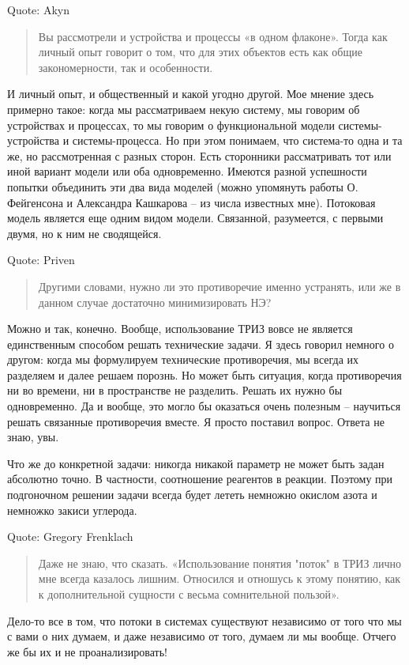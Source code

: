 \documentclass[a4paper,11pt]{article}
\begin{document}
Quote: Akyn
\begin{quote}
  Вы рассмотрели и устройства и процессы «в одном флаконе». Тогда как личный
  опыт говорит о том, что для этих объектов есть как общие закономерности, так
  и особенности.
\end{quote}
И личный опыт, и общественный и какой угодно другой. Мое мнение здесь примерно
такое: когда мы рассматриваем некую систему, мы говорим об устройствах и
процессах, то мы говорим о функциональной модели системы-устройства и
системы-процесса. Но при этом понимаем, что система-то одна и та же, но
рассмотренная с разных сторон. Есть сторонники рассматривать тот или иной
вариант модели или оба одновременно. Имеются разной успешности попытки
объединить эти два вида моделей (можно упомянуть работы О. Фейгенсона и
Александра Кашкарова – из числа известных мне). Потоковая модель является еще
одним видом модели. Связанной, разумеется, с первыми двумя, но к ним не
сводящейся.

Quote: Priven
\begin{quote}      
  Другими словами, нужно ли это противоречие именно устранять, или же в данном
  случае достаточно минимизировать НЭ?
\end{quote}
Можно и так, конечно. Вообще, использование ТРИЗ вовсе не является
единственным способом решать технические задачи. Я здесь говорил немного о
другом: когда мы формулируем технические противоречия, мы всегда их разделяем
и далее решаем порознь. Но может быть ситуация, когда противоречия ни во
времени, ни в пространстве не разделить. Решать их нужно бы одновременно. Да и
вообще, это могло бы оказаться очень полезным – научиться решать связанные
противоречия вместе. Я просто поставил вопрос. Ответа не знаю, увы.

Что же до конкретной задачи: никогда никакой параметр не может быть задан
абсолютно точно. В частности, соотношение реагентов в реакции. Поэтому при
подгоночном решении задачи всегда будет лететь немножно окислом азота и
немножко закиси углерода.

Quote: Gregory Frenklach
\begin{quote}
  Даже не знаю, что сказать.  «Использование понятия "поток" в ТРИЗ лично мне
  всегда казалось лишним.  Относился и отношусь к этому понятию, как к
  дополнительной сущности с весьма сомнительной пользой».
\end{quote}
Дело-то все в том, что потоки в системах существуют независимо от того что мы
с вами о них думаем, и даже независимо от того, думаем ли мы вообще. Отчего же
бы их и не проанализировать!
\end{document}
